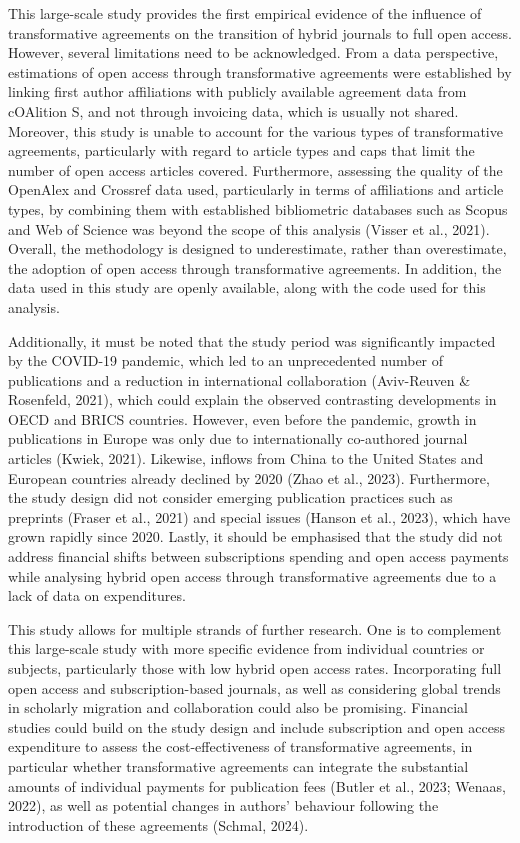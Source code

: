 \documentclass[a4paper,man,floatsintext,longtable,noextraspace,12pt]{apa6}
\begin{document}
This large-scale study provides the first empirical evidence of the
influence of transformative agreements on the transition of hybrid
journals to full open access. However, several limitations need to be
acknowledged. From a data perspective, estimations of open access
through transformative agreements were established by linking first
author affiliations with publicly available agreement data from
cOAlition S, and not through invoicing data, which is usually not
shared. Moreover, this study is unable to account for the various types
of transformative agreements, particularly with regard to article types
and caps that limit the number of open access articles covered.
Furthermore, assessing the quality of the OpenAlex and Crossref data
used, particularly in terms of affiliations and article types, by
combining them with established bibliometric databases such as Scopus
and Web of Science was beyond the scope of this analysis (Visser et al.,
2021). Overall, the methodology is designed to underestimate, rather
than overestimate, the adoption of open access through transformative
agreements. In addition, the data used in this study are openly
available, along with the code used for this analysis.

Additionally, it must be noted that the study period was significantly
impacted by the COVID-19 pandemic, which led to an unprecedented number
of publications and a reduction in international collaboration
(Aviv-Reuven \& Rosenfeld, 2021), which could explain the observed
contrasting developments in OECD and BRICS countries. However, even
before the pandemic, growth in publications in Europe was only due to
internationally co-authored journal articles (Kwiek, 2021). Likewise,
inflows from China to the United States and European countries already
declined by 2020 (Zhao et al., 2023). Furthermore, the study design did
not consider emerging publication practices such as preprints (Fraser et
al., 2021) and special issues (Hanson et al., 2023), which have grown
rapidly since 2020. Lastly, it should be emphasised that the study did
not address financial shifts between subscriptions spending and open
access payments while analysing hybrid open access through
transformative agreements due to a lack of data on expenditures.

This study allows for multiple strands of further research. One is to
complement this large-scale study with more specific evidence from
individual countries or subjects, particularly those with low hybrid
open access rates. Incorporating full open access and subscription-based
journals, as well as considering global trends in scholarly migration
and collaboration could also be promising. Financial studies could build
on the study design and include subscription and open access expenditure
to assess the cost-effectiveness of transformative agreements, in
particular whether transformative agreements can integrate the
substantial amounts of individual payments for publication fees (Butler
et al., 2023; Wenaas, 2022), as well as potential changes in authors'
behaviour following the introduction of these agreements (Schmal, 2024).
\end{document}
